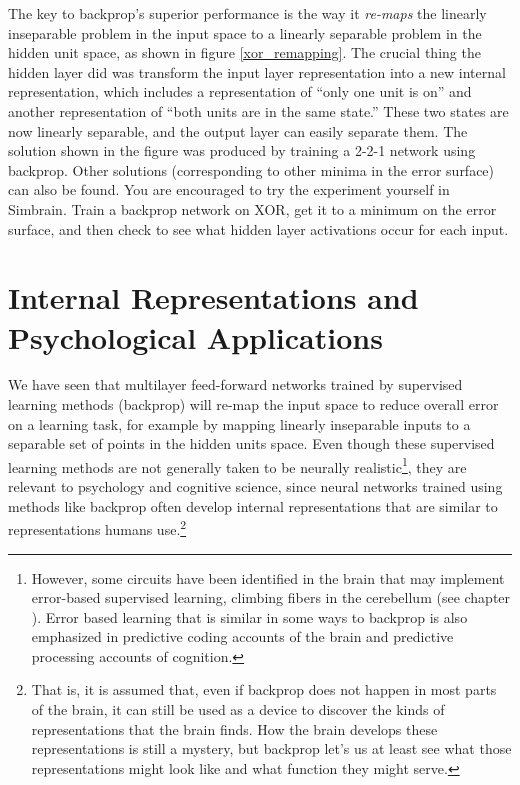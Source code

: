 The key to backprop's superior performance is the way it \emph{re-maps} the linearly inseparable problem in the input space to a linearly separable problem in the hidden unit space, as shown in figure \ref{xor_remapping}. The crucial thing the hidden layer did was transform the input layer representation into a new internal representation, which includes a representation of ``only one unit is on'' and another representation of ``both units are in the same state.''  These two states are now linearly separable, and the output layer can easily separate them. The solution shown in the figure was produced by training a 2-2-1 network using backprop. Other solutions (corresponding to other minima in the error surface) can also be found. You are encouraged to try the experiment yourself in Simbrain. Train a backprop network on XOR, get it to a minimum on the error surface, and then check to see what hidden layer activations occur for each input.

\section{Internal Representations and Psychological Applications}\label{internalRepsFF}


We have seen that multilayer feed-forward networks trained by supervised learning methods (\eg backprop) will re-map the input space to reduce overall error on a learning task, for example by mapping linearly inseparable inputs to a separable set of points in the hidden units space. Even though these supervised learning methods are not generally taken to be neurally realistic\footnote{However, some circuits have been identified in the brain that may implement error-based supervised learning, \eg climbing fibers in the cerebellum (see chapter ). Error based learning that is similar in some ways to backprop is also emphasized in predictive coding accounts of the brain and predictive processing accounts of cognition.}, they are relevant to psychology and cognitive science, since neural networks trained using methods like backprop often develop internal representations that are similar to representations humans use.\footnote{That is, it is assumed that, even if backprop does not happen in most parts of the brain, it can still be used as a device to discover the kinds of representations that the brain finds. How the brain develops these representations is still a mystery, but backprop let's us at least see what those representations might look like and what function they might serve.}

